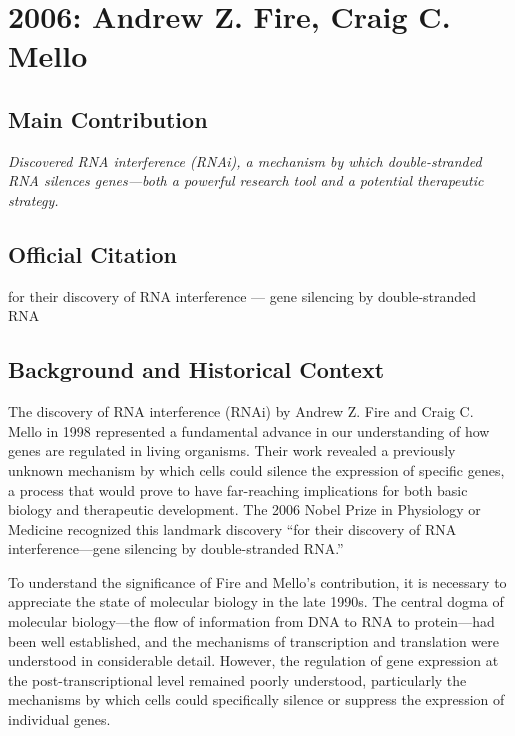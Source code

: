 \chapter[2006 --- Fire et al.]{2006: Andrew Z. Fire, Craig C. Mello}
\label{ch:2006_Fire}

\section*{Main Contribution}

\textit{Discovered RNA interference (RNAi), a mechanism by which double-stranded RNA silences genes---both a powerful research tool and a potential therapeutic strategy.}\cite{nobel-2006,lecture-2006}

\section{Official Citation}

for their discovery of RNA interference — gene silencing by double-stranded RNA

\section{Background and Historical Context}

The discovery of RNA interference (RNAi) by Andrew Z. Fire and Craig C. Mello in 1998 represented a fundamental advance in our understanding of how genes are regulated in living organisms. Their work revealed a previously unknown mechanism by which cells could silence the expression of specific genes, a process that would prove to have far-reaching implications for both basic biology and therapeutic development. The 2006 Nobel Prize in Physiology or Medicine recognized this landmark discovery ``for their discovery of RNA interference---gene silencing by double-stranded RNA.''

To understand the significance of Fire and Mello's contribution, it is necessary to appreciate the state of molecular biology in the late 1990s. The central dogma of molecular biology---the flow of information from DNA to RNA to protein---had been well established, and the mechanisms of transcription and translation were understood in considerable detail. However, the regulation of gene expression at the post-transcriptional level remained poorly understood, particularly the mechanisms by which cells could specifically silence or suppress the expression of individual genes.


